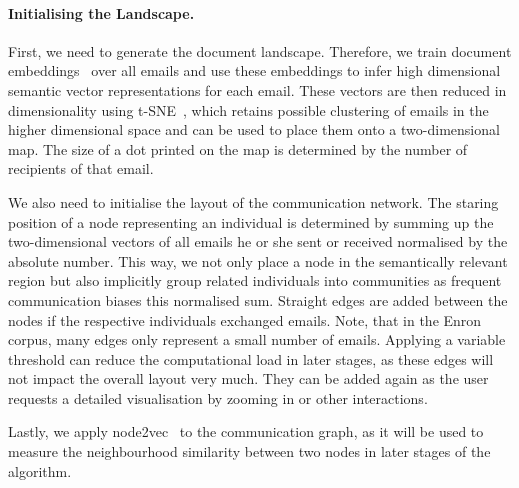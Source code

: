 


\paragraph{Initialising the Landscape.}
First, we need to generate the document landscape.
Therefore, we train document embeddings~\cite{le2014distributed,hu2017} over all emails and use these embeddings to infer high dimensional semantic vector representations for each email.
These vectors are then reduced in dimensionality using t-SNE~\cite{maaten2008visualizing}, which retains possible clustering of emails in the higher dimensional space and can be used to place them onto a two-dimensional map.
The size of a dot printed on the map is determined by the number of recipients of that email.

We also need to initialise the layout of the communication network.
The staring position of a node representing an individual is determined by summing up the two-dimensional vectors of all emails he or she sent or received normalised by the absolute number.
This way, we not only place a node in the semantically relevant region but also implicitly group related individuals into communities as frequent communication biases this normalised sum.
Straight edges are added between the nodes if the respective individuals exchanged emails.
Note, that in the Enron corpus, many edges only represent a small number of emails.
Applying a variable threshold can reduce the computational load in later stages, as these edges will not impact the overall layout very much.
They can be added again as the user requests a detailed visualisation by zooming in or other interactions.


Lastly, we apply node2vec~\cite{grover2016node2vec} to the communication graph, as it will be used to measure the neighbourhood similarity between two nodes in later stages of the algorithm.


